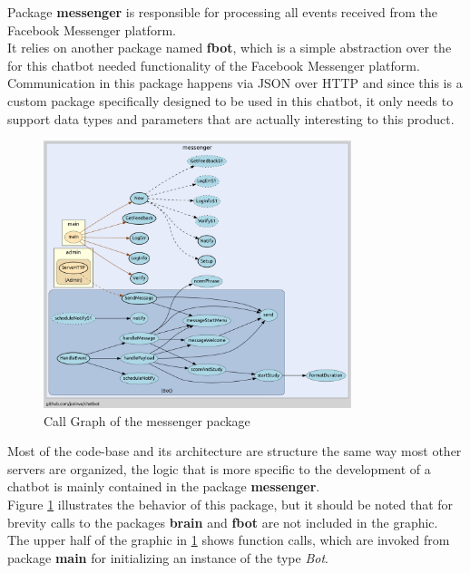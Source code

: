 Package \textbf{messenger} is responsible for processing all events received from the Facebook Messenger platform.
\\

It relies on another package named \textbf{fbot},
which is a simple abstraction over the for this chatbot needed functionality of the Facebook Messenger platform.
Communication in this package happens via JSON over HTTP and since this is a custom package
specifically designed to be used in this chatbot, it only needs to support data types and parameters that are actually interesting to this product.
\\

\begin{figure}[h]
  \centering
  \includegraphics[width=0.8\textwidth]{images/call-graph-messenger.png}
	\caption{Call Graph of the messenger package\footnotemark}
	\label{fig:call-graph-messenger}
\end{figure}


Most of the code-base and its architecture are structure the same way most other servers are organized,
the logic that is more specific to the development of a chatbot is mainly contained in the package \textbf{messenger}.
\\
Figure \ref{fig:call-graph-messenger} illustrates the behavior of this package,
but it should be noted that for brevity calls to the packages \textbf{brain} and \textbf{fbot} are not included in the graphic.
\\
The upper half of the graphic in \ref{fig:call-graph-messenger} shows function calls,
which are invoked from package \textbf{main} for initializing an instance of the type \emph{Bot}.
\\

